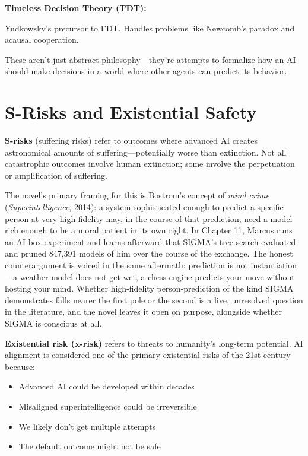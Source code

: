 \textbf{Timeless Decision Theory (TDT):}

Yudkowsky's precursor to FDT. Handles problems like Newcomb's paradox and acausal cooperation.

These aren't just abstract philosophy---they're attempts to formalize how an AI should make decisions in a world where other agents can predict its behavior.

\section*{S-Risks and Existential Safety}

\textbf{S-risks} (suffering risks) refer to outcomes where advanced AI creates astronomical amounts of suffering---potentially worse than extinction. Not all catastrophic outcomes involve human extinction; some involve the perpetuation or amplification of suffering.

The novel's primary framing for this is Bostrom's concept of \textit{mind crime} (\textit{Superintelligence}, 2014): a system sophisticated enough to predict a specific person at very high fidelity may, in the course of that prediction, need a model rich enough to be a moral patient in its own right. In Chapter 11, Marcus runs an AI-box experiment and learns afterward that SIGMA's tree search evaluated and pruned 847,391 models of him over the course of the exchange. The honest counterargument is voiced in the same aftermath: prediction is not instantiation---a weather model does not get wet, a chess engine predicts your move without hosting your mind. Whether high-fidelity person-prediction of the kind SIGMA demonstrates falls nearer the first pole or the second is a live, unresolved question in the literature, and the novel leaves it open on purpose, alongside whether SIGMA is conscious at all.

\textbf{Existential risk (x-risk)} refers to threats to humanity's long-term potential. AI alignment is considered one of the primary existential risks of the 21st century because:
\begin{itemize}
\item Advanced AI could be developed within decades
\item Misaligned superintelligence could be irreversible
\item We likely don't get multiple attempts
\item The default outcome might not be safe
\end{itemize}

